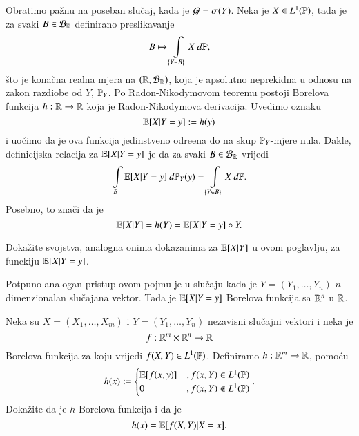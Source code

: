 Obratimo pa\v znu na poseban slu\v caj, kada je $\mathcal{G} = \sigma({Y})$.
Neka je $X \in L^1 (\mathbb{P})$, tada je za svaki $B \in \mathcal{B}_{\mathbb{R}}$ definirano preslikavanje
\begin{equation*}
    B \mapsto \int\limits_{\{ Y \in B \}} X \: d \mathbb{P},
\end{equation*}
\v sto je kona\v cna realna mjera na $(\mathbb{R}, \mathcal{B}_{\mathbb{R}})$, koja je apsolutno neprekidna u odnosu na zakon razdiobe od $Y$, $\mathbb{P}_Y$.
Po Radon-Nikodymovom teoremu postoji Borelova funkcija $h : \mathbb{R} \to \mathbb{R}$ koja je Radon-Nikodymova derivacija.
Uvedimo oznaku
\begin{equation}    \label{jed:22.19}
    \mathbb{E} [X | Y = y] := h (y)
\end{equation}
i uo\v cimo da je ova funkcija jedinstveno odre\dj ena do na skup $\mathbb{P}_Y$-mjere nula.
Dakle, definicijska relacija za $\mathbb{E} [X | Y = y]$ je da za svaki $B \in \mathcal{B}_{\mathbb{R}}$ vrijedi
\begin{equation}    \label{jed:22.20}
    \int\limits_B \mathbb{E} [X | Y = y] \: d \mathbb{P}_Y (y) = \int\limits_{\{ Y \in B \}} X \: d \mathbb{P}.
\end{equation}
Posebno, to zna\v ci da je
\begin{equation}    \label{jed:22.21}
    \mathbb{E} [X | Y] = h (Y) = \mathbb{E} [X | Y = y] \circ Y.
\end{equation}

\begin{zad} \label{zad:22.22}
    Doka\v zite svojstva, analogna onima dokazanima za $\mathbb{E} [X | Y]$ u ovom poglavlju, za funckiju $\mathbb{E} [X | Y = y]$.
\end{zad}

\begin{nap} \label{nap:22.23}
    Potpuno analogan pristup ovom pojmu je u slu\v caju kada je $Y = (Y_1, \ldots, Y_n)$ $n$-dimenzionalan slu\v cajana vektor.
    Tada je $\mathbb{E} [X | Y = y]$ Borelova funkcija sa $\mathbb{R}^n$ u $\mathbb{R}$.
\end{nap}

\begin{zad} \label{zad:22.24}
    Neka su $X = (X_1, \ldots, X_m)$ i $Y = (Y_1, \ldots, Y_n)$ nezavisni slu\v cajni vektori i neka je
    \begin{equation*}
        f : \mathbb{R}^m \times \mathbb{R}^n \to \mathbb{R}
    \end{equation*}
    Borelova funkcija za koju vrijedi $f (X, Y) \in L^1 (\mathbb{P})$.
    Definiramo $h: \mathbb{R}^m \to \mathbb{R}$, pomo\' cu
    \begin{equation*}
        h (x) :=
        \begin{cases}
            \mathbb{E} [ f (x, y)] &, f (x, Y) \in L^1 (\mathbb{P})\\
            0 &, f (x, Y) \notin L^1 (\mathbb{P})
        \end{cases}.
    \end{equation*}
    Doka\v zite da  je $h$ Borelova funkcija i da je
    \begin{equation*}
        h (x) = \mathbb{E} [f (X, Y) | X = x].
    \end{equation*}
\end{zad}

